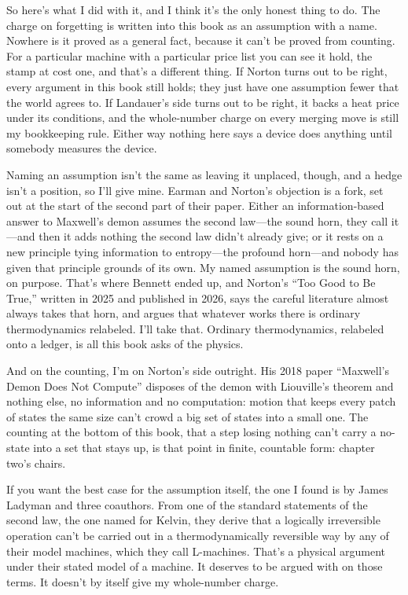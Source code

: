 \documentclass[11pt,twoside]{article}
\theoremstyle{thielethm}
\theoremstyle{thieledef}
\theoremstyle{thieledef}
\theoremstyle{thieledef}
\theoremstyle{thielethm}
\theoremstyle{thieleobs}
\theoremstyle{thielethm}
\begin{document}
So here's what I did with it, and I think it's the only honest thing to do. The charge on forgetting is written into this book as an assumption with a name. Nowhere is it proved as a general fact, because it can't be proved from counting. For a particular machine with a particular price list you can see it hold, the stamp at cost one, and that's a different thing. If Norton turns out to be right, every argument in this book still holds; they just have one assumption fewer that the world agrees to. If Landauer's side turns out to be right, it backs a heat price under its conditions, and the whole-number charge on every merging move is still my bookkeeping rule. Either way nothing here says a device does anything until somebody measures the device.

Naming an assumption isn't the same as leaving it unplaced, though, and a hedge isn't a position, so I'll give mine. Earman and Norton's objection is a fork, set out at the start of the second part of their paper. Either an information-based answer to Maxwell's demon assumes the second law---the sound horn, they call it---and then it adds nothing the second law didn't already give; or it rests on a new principle tying information to entropy---the profound horn---and nobody has given that principle grounds of its own. My named assumption is the sound horn, on purpose. That's where Bennett ended up, and Norton's ``Too Good to Be True,'' written in 2025 and published in 2026, says the careful literature almost always takes that horn, and argues that whatever works there is ordinary thermodynamics relabeled. I'll take that. Ordinary thermodynamics, relabeled onto a ledger, is all this book asks of the physics.

And on the counting, I'm on Norton's side outright. His 2018 paper ``Maxwell's Demon Does Not Compute'' disposes of the demon with Liouville's theorem and nothing else, no information and no computation: motion that keeps every patch of states the same size can't crowd a big set of states into a small one. The counting at the bottom of this book, that a step losing nothing can't carry a no-state into a set that stays up, is that point in finite, countable form: chapter two's chairs.

If you want the best case for the assumption itself, the one I found is by James Ladyman and three coauthors. From one of the standard statements of the second law, the one named for Kelvin, they derive that a logically irreversible operation can't be carried out in a thermodynamically reversible way by any of their model machines, which they call L-machines. That's a physical argument under their stated model of a machine. It deserves to be argued with on those terms. It doesn't by itself give my whole-number charge.
\end{document}
